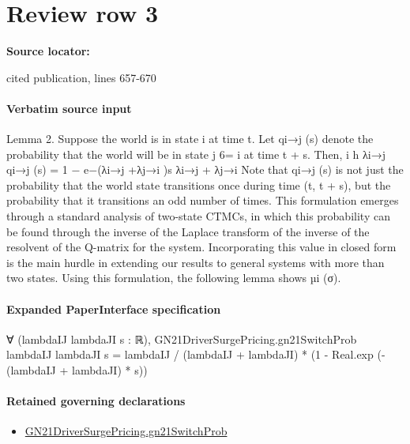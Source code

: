 \documentclass[10pt]{article}
\begin{document}
\section*{Review row 3}
\textbf{Source locator:} {\footnotesize\raggedright cited publication, lines 657-\allowbreak{}670\par}
\paragraph{Verbatim source input}
\begin{ReviewVerbatim}
Lemma 2. Suppose the world is in state i at time t. Let qi→j (s) denote the probability that the
world will be in state j 6= i at time t + s. Then,
i
h
λi→j
qi→j (s) =
1 − e−(λi→j +λj→i )s
λi→j + λj→i
Note that qi→j (s) is not just the probability that the world state transitions once during time
(t, t + s), but the probability that it transitions an odd number of times. This formulation emerges
through a standard analysis of two-state CTMCs, in which this probability can be found through
the inverse of the Laplace transform of the inverse of the resolvent of the Q-matrix for the system.
Incorporating this value in closed form is the main hurdle in extending our results to general systems
with more than two states. Using this formulation, the following lemma shows µi (σ).
\end{ReviewVerbatim}



\paragraph{Expanded PaperInterface specification}
\begin{ReviewVerbatim}
∀ (lambdaIJ lambdaJI s : ℝ),
  GN21DriverSurgePricing.gn21SwitchProb lambdaIJ lambdaJI s =
    lambdaIJ / (lambdaIJ + lambdaJI) * (1 - Real.exp (-(lambdaIJ + lambdaJI) * s))
\end{ReviewVerbatim}

\paragraph{Retained governing declarations}
\begin{itemize}\raggedright
\item \hyperlink{governing-declaration-2506e20884d6eb69}{GN21\allowbreak{}Driver\allowbreak{}Surge\allowbreak{}Pricing.\allowbreak{}gn21\allowbreak{}Switch\allowbreak{}Prob}
\end{itemize}
\end{document}
